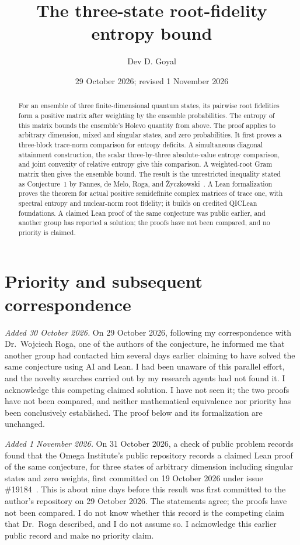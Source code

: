 \documentclass[11pt,a4paper]{article}
\title{The three-state root-fidelity entropy bound}\author{Dev D. Goyal}\date{29 October 2026; revised 1 November 2026}
\begin{document}
\maketitle
\begin{abstract}
For an ensemble of three finite-dimensional quantum states, its pairwise
root fidelities form a positive matrix after weighting by the ensemble
probabilities. The entropy of this matrix bounds the ensemble's Holevo
quantity from above. The proof applies to arbitrary dimension, mixed and
singular states, and zero probabilities. It first proves a three-block
trace-norm comparison for entropy deficits. A simultaneous diagonal
attainment construction, the scalar three-by-three absolute-value entropy
comparison, and joint convexity of relative entropy give this comparison.
A weighted-root Gram matrix then gives the ensemble bound. The result is
the unrestricted inequality stated as Conjecture~1 by Fannes, de Melo, Roga,
and \.{Z}yczkowski~\cite{fmrz}. A Lean formalization proves the theorem for
actual positive semidefinite complex matrices of trace one, with spectral
entropy and nuclear-norm root fidelity; it builds on credited QICLean
foundations. A claimed Lean proof of the same conjecture was public earlier,
and another group has reported a solution; the proofs have not been compared,
and no priority is claimed.
\end{abstract}

\section*{Priority and subsequent correspondence}
\emph{Added 30 October 2026.} On 29 October 2026, following my correspondence with Dr.~Wojciech Roga, one of the authors of the conjecture, he informed me that another group had contacted him several days earlier claiming to have solved the same conjecture using AI and Lean. I had been unaware of this parallel effort, and the novelty searches carried out by my research agents had not found it. I acknowledge this competing claimed solution. I have not seen it; the two proofs have not been compared, and neither mathematical equivalence nor priority has been conclusively established. The proof below and its formalization are unchanged.

\emph{Added 1 November 2026.} On 31 October 2026, a check of public problem records found that the Omega Institute's public repository records a claimed Lean proof of the same conjecture, for three states of arbitrary dimension including singular states and zero weights, first committed on 19 October 2026 under issue \#19184~\cite{omega}. This is about nine days before this result was first committed to the author's repository on 29 October 2026. The statements agree; the proofs have not been compared. I do not know whether this record is the competing claim that Dr.~Roga described, and I do not assume so. I acknowledge this earlier public record and make no priority claim.
\end{document}
